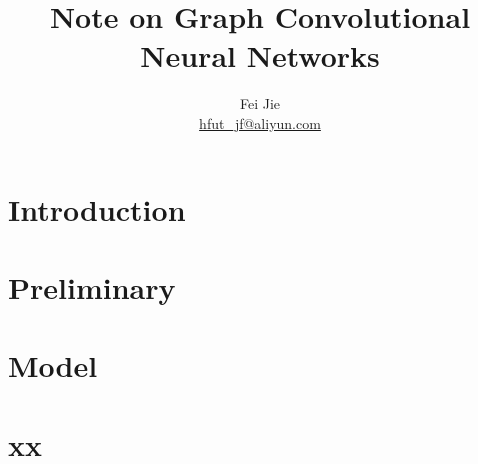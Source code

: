 \documentclass{article}
\title{Note on Graph Convolutional Neural Networks}
\author{Fei Jie \\ \href{}{hfut\_jf@aliyun.com}}
\begin{document}
\maketitle
\thispagestyle{firstpage}

\section{Introduction}


\section{Preliminary}


\section{Model		}


\section{xx}




\end{document}
